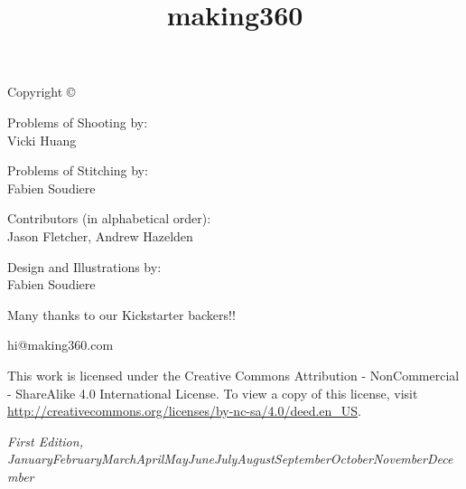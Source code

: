 \documentclass[notoc, justified]{tufte-book}
\title{making360} %
\author{} %
\newcommand{\monthyear}{\ifcase\month\or January\or February\or March\or April\or May\or June\or July\or August\or September\or October\or November\or December\fi\space\number\year} %
\begin{document}
\setlength{\parskip}{12pt}
\setlength{\parindent}{0pt}
\let\cleardoublepage\clearpage

\makeatletter
\def\@makechapterhead#1{%
  {\parindent \z@ \raggedright \normalfont
    \ifnum \c@secnumdepth >\m@ne
        \huge\bfseries \@chapapp\space \thechapter
        \par\nobreak
        \vskip 20\p@
    \fi
    \interlinepenalty\@M
    \Huge \bfseries #1\par\nobreak
    \vskip 20\p@
  }}
\makeatother


\frontmatter



\maketitlepage


\newpage
\thispagestyle{empty}
\setlength{\parindent}{0pt}
\setlength{\parskip}{\baselineskip}
Copyright \copyright\ \the\year\ \thanklessauthor


\begin{fullwidth}

\par{Problems of Shooting by:
\\
Vicki Huang}

\par{Problems of Stitching by:
\\
Fabien Soudiere}

\par{Contributors (in alphabetical order):
\\
Jason Fletcher, Andrew Hazelden}

\par{Design and Illustrations by: 
\\
Fabien Soudiere}

\par{Many thanks to our Kickstarter backers!!}

\par{hi@making360.com}

\par This work is licensed under the Creative Commons Attribution - NonCommercial - ShareAlike 4.0 International License. To view a copy of this license, visit \url{http://creativecommons.org/licenses/by-nc-sa/4.0/deed.en_US}.

\par\textit{First Edition, \monthyear}
\end{fullwidth}
\end{document}
